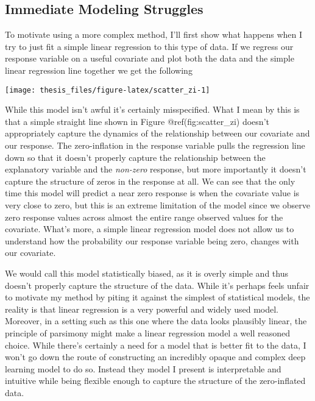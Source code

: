 \documentclass[12pt,twoside]{reedthesis}
\begin{document}
\hypertarget{immediate-modeling-struggles}{%
\subsection{Immediate Modeling Struggles}\label{immediate-modeling-struggles}}

To motivate using a more complex method, I'll first show what happens when I try to just fit a simple linear regression to this type of data. If we regress our response variable on a useful covariate and plot both the data and the simple linear regression line together we get the following
\begin{center}\texttt{[image: thesis\_files/figure-latex/scatter\_zi-1]} \end{center}

While this model isn't awful it's certainly misspecified. What I mean by this is that a simple straight line shown in Figure @ref(fig:scatter\_zi) doesn't appropriately capture the dynamics of the relationship between our covariate and our response. The zero-inflation in the response variable pulls the regression line down so that it doesn't properly capture the relationship between the explanatory variable and the \emph{non-zero} response, but more importantly it doesn't capture the structure of zeros in the response at all. We can see that the only time this model will predict a near zero response is when the covariate value is very close to zero, but this is an extreme limitation of the model since we observe zero response values across almost the entire range observed values for the covariate. What's more, a simple linear regression model does not allow us to understand how the probability our response variable being zero, changes with our covariate.

We would call this model statistically biased, as it is overly simple and thus doesn't properly capture the structure of the data. While it's perhaps feels unfair to motivate my method by piting it against the simplest of statistical models, the reality is that linear regression is a very powerful and widely used model. Moreover, in a setting such as this one where the data looks plausibly linear, the principle of parsimony might make a linear regression model a well reasoned choice. While there's certainly a need for a model that is better fit to the data, I won't go down the route of constructing an incredibly opaque and complex deep learning model to do so. Instead they model I present is interpretable and intuitive while being flexible enough to capture the structure of the zero-inflated data.
\end{document}
